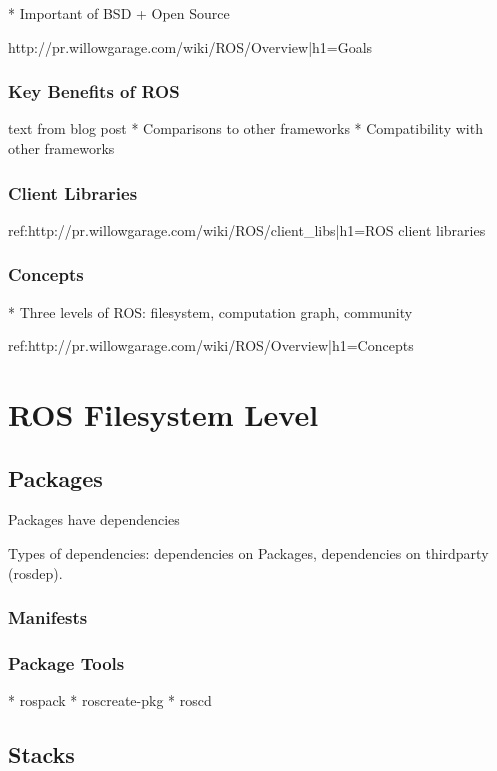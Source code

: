 \documentclass[twoside,10pt]{article}
\begin{document}
   * Important of BSD + Open Source

http://pr.willowgarage.com/wiki/ROS/Overview|h1=Goals

\subsubsection{Key Benefits of ROS}

text from blog post
   * Comparisons to other frameworks
   * Compatibility with other frameworks

\subsubsection{Client Libraries}

ref:http://pr.willowgarage.com/wiki/ROS/client_libs|h1=ROS client libraries



\subsubsection{Concepts}

 * Three levels of ROS: filesystem, computation graph, community

ref:http://pr.willowgarage.com/wiki/ROS/Overview|h1=Concepts


\section{ROS Filesystem Level}

\subsection{Packages}

Packages have dependencies

Types of dependencies: dependencies on Packages, dependencies on thirdparty (rosdep).


\subsubsection{Manifests}

\subsubsection{Package Tools}

       * rospack
       * roscreate-pkg
       * roscd

\subsection{Stacks}
\end{document}
